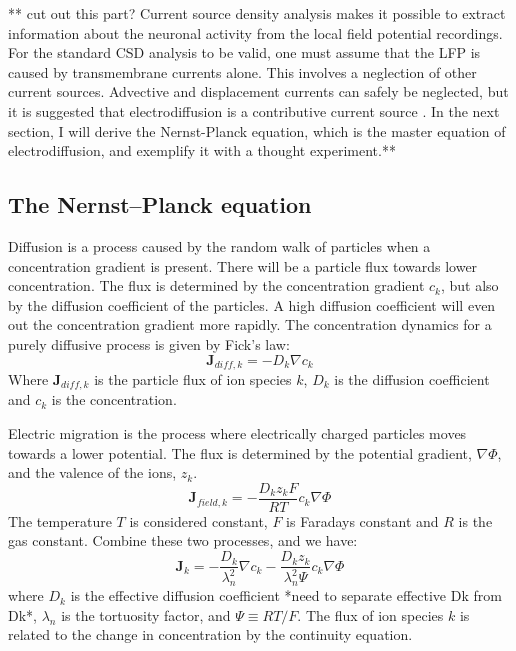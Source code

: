 \documentclass{article}
\begin{document}
** cut out this part?
Current source density analysis makes it possible to extract information about the neuronal activity from the local field potential recordings. For the standard CSD analysis to be valid, one must assume that the LFP is caused by transmembrane currents alone. This involves a neglection of other current sources. Advective and displacement currents can safely be neglected, but it is suggested that electrodiffusion is a contributive current source \cite{Gratiy2017}. In the next section, I will derive the Nernst-Planck equation, which is the master equation of electrodiffusion, and exemplify it with a thought experiment.**

\subsection{The Nernst--Planck equation}\label{electrodiffusion}

Diffusion is a process caused by the random walk of particles when a concentration gradient is present. There will be a particle flux towards lower concentration. The flux is determined by the concentration gradient $c_k$, but also by the diffusion coefficient of the particles. A high diffusion coefficient will even out the concentration gradient more rapidly. The concentration dynamics for a purely diffusive process is given by Fick's law:
\begin{equation}\label{eq:diff}
 \bm{J}_{diff,k} = - D_k\nabla c_k
\end{equation}
Where  $\bm{J}_{diff,k}$ is the particle flux of ion species $k$, $D_k$ is the diffusion coefficient and $c_k$ is the concentration.

Electric migration is the process where electrically charged particles moves towards a lower potential. The flux is determined by the potential gradient, $\nabla \Phi$,  and the valence of the ions, $z_k$. 
\begin{equation}\label{eq:field}
\bm{J}_{field,k} = -\frac{D_kz_kF}{RT} c_k\nabla \Phi
\end{equation}
The temperature $T$ is considered constant, $F$ is Faradays constant and $R$ is the gas constant. Combine these two processes, and we have:
 \begin{equation}\label{eq:eldiff flux}
\bm{J}_k = -\frac{D_k}{\lambda_n^2}\nabla c_k -\frac{D_k z_k}{\lambda_n^2 \Psi}c_k  \nabla \Phi
\end{equation}
where $D_k$ is the effective diffusion coefficient *need to separate effective Dk from Dk*, $\lambda_n$ is the tortuosity factor, and $\Psi \equiv RT/F$.
The flux  of ion species $k$ is related to the change in concentration by the continuity equation. 
\end{document}
